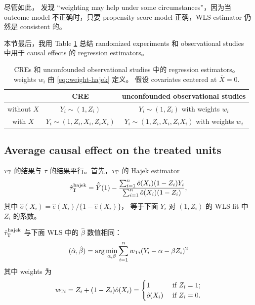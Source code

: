 尽管如此，\citet{freedman2008weighting} 发现 ``weighting may help under some circumstances''，因为当 outcome model 不正确时，只要 propensity score model 正确，WLS estimator 仍然是 consistent 的。



本节最后，我用 Table \ref{table::regression-causal-cre-obs} 总结 randomized experiments 和 observational studies 中用于 causal effects 的 regression estimators。



\begin{table}
\caption{CREs 和 unconfounded observational studies 中的 regression estimators。weights $w_i$ 由 \eqref{eq::weight-hajek} 定义。
假设 covariates centered at $\bar{X} = 0$.}\label{table::regression-causal-cre-obs}
\begin{tabular}{|c|cc|}
\hline 
 & CRE & unconfounded observational studies \\
 \hline 
without $X$ &  $Y_i\sim (1, Z_i)$ & $Y_i\sim (1, Z_i)$ with weights $w_i$   \\
with $X$ & $Y_i\sim (1, Z_i ,X_i, Z_i X_i ) $ & $Y_i\sim (1, Z_i ,X_i, Z_i X_i )$ with weights $w_i$  \\
\hline 
\end{tabular}
\end{table}



\subsection{Average causal effect on the treated units}

$\tau_\textsc{T}$ 的结果与 $\tau$ 的结果平行。首先，$\tau_\textsc{T}$ 的 Hajek estimator
$$
\hat{\tau}_\textsc{T}^\text{hajek} = \hat{\bar{Y}}(1) 
- \frac{  \sum_{i=1}^n \hat{o}(X_i) (1-Z_i) Y_i }{ \sum_{i=1}^n \hat{o}(X_i) (1-Z_i) } ,
$$
其中 $\hat{o}(X_i) = \hat{e}(X_i) / \{ 1- \hat{e}(X_i) \}$，
等于下面 $Y_i$ 对 $(1,Z_i)$ 的 WLS fit 中 $Z_i$ 的系数。


\begin{proposition}
\label{prop::hajek-att}
$\hat\tau_\textsc{T}^{\text{hajek}}$ 与下面 WLS 中的 $\hat{\beta}$ 数值相同：
$$
(\hat{\alpha}, \hat{\beta}) = \arg\min_{\alpha, \beta} \sum_{i=1}^n  w_{\textsc{T}i}  (Y_i - \alpha - \beta Z_i)^2
$$
其中 weights 为
\begin{eqnarray}\label{eq::weight-hajek-att}
w_{\textsc{T}i} = Z_i +(1-Z_i )  \hat{o}(X_i)
= 
\begin{cases}
1 & \text{ if } Z_i=1;\\
 \hat{o}(X_i)   & \text{ if } Z_i=0.
\end{cases} 
\end{eqnarray}
\end{proposition}

